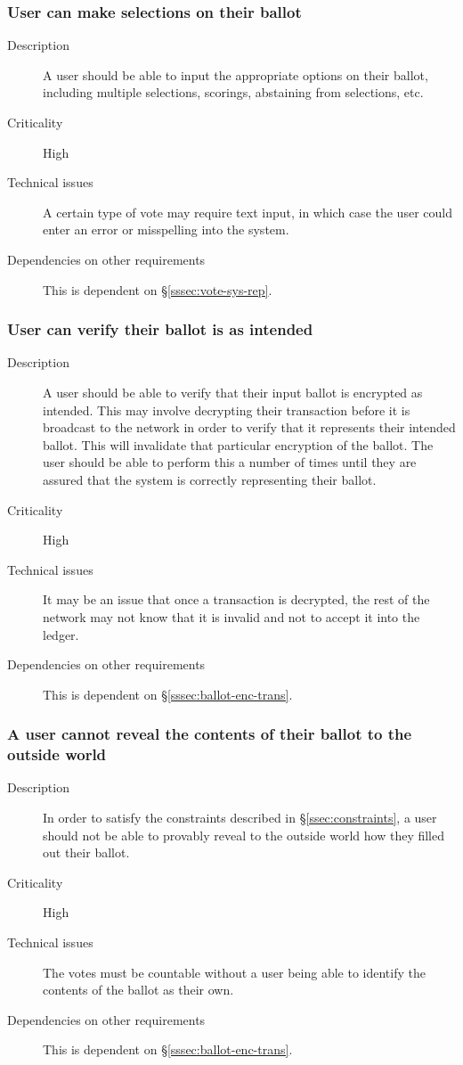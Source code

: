 \documentclass[a4paper,12pt]{article}
\begin{document}
\subsubsection{User can make selections on their ballot}
\begin{description}
	\item[Description]
		A user should be able to input the appropriate options on their ballot, including multiple selections, scorings, abstaining from selections, etc.
	\item[Criticality]
		High
	\item[Technical issues]
		A certain type of vote may require text input, in which case the user could enter an error or misspelling into the system.
	\item[Dependencies on other requirements]
		This is dependent on \S\ref{sssec:vote-sys-rep}.
\end{description}

\subsubsection{User can verify their ballot is as intended}
\begin{description}
	\item[Description]
		A user should be able to verify that their input ballot is encrypted as intended. This may involve decrypting their transaction before it is broadcast to the network in order to verify that it represents their intended ballot. This will invalidate that particular encryption of the ballot. The user should be able to perform this a number of times until they are assured that the system is correctly representing their ballot.
	\item[Criticality]
		High
	\item[Technical issues]
		It may be an issue that once a transaction is decrypted, the rest of the network may not know that it is invalid and not to accept it into the ledger.
	\item[Dependencies on other requirements]
		This is dependent on \S\ref{sssec:ballot-enc-trans}.
\end{description}

\subsubsection{A user cannot reveal the contents of their ballot to the outside world}
\begin{description}
	\item[Description]
		In order to satisfy the constraints described in \S\ref{ssec:constraints}, a user should not be able to provably reveal to the outside world how they filled out their ballot.
	\item[Criticality]
		High
	\item[Technical issues]
		The votes must be countable without a user being able to identify the contents of the ballot as their own.
	\item[Dependencies on other requirements]
		This is dependent on \S\ref{sssec:ballot-enc-trans}.
\end{description}
\end{document}
